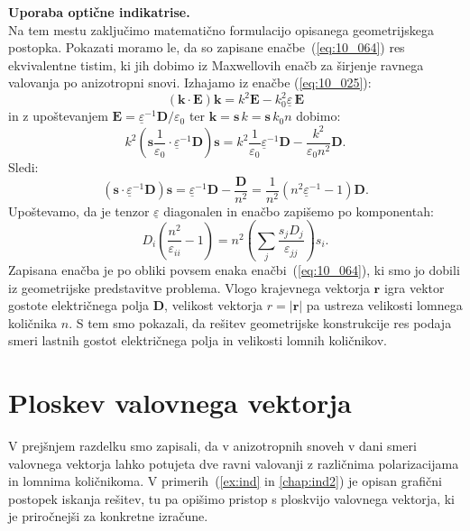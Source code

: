 \begin{example}{\bf Uporaba optične indikatrise.}
\begin{equation}
\label{eq:10_064}
\end{equation}
Na tem mestu zaključimo matematično formulacijo opisanega geometrijskega postopka. Pokazati moramo le, 
da so zapisane enačbe~(\ref{eq:10_064}) res ekvivalentne tistim, ki jih dobimo iz
Maxwellovih enačb za širjenje ravnega valovanja po anizotropni snovi. Izhajamo iz enačbe (\ref{eq:10_025}):
\begin{equation}
\left(\mathbf{k}\cdot \mathbf{E}\right)\mathbf{k} = k^2 \mathbf{E}- k_0^2\underline{\varepsilon}\,\mathbf{E}
\label{eq:10_065}
\end{equation}
in z upoštevanjem $\mathbf{E} = \underline{\varepsilon}^{-1} \mathbf{D}/\varepsilon_0$ 
ter $\mathbf{k} = \mathbf{s}\,k = \mathbf{s}\,k_0 n$ dobimo:
\begin{equation}
k^2 \left(\mathbf{s}\frac{1}{\varepsilon_0}\cdot \underline{\varepsilon}^{-1}\mathbf{D}\right) \mathbf{s} = k^2 \frac{1}{\varepsilon_0}\underline{\varepsilon}^{-1} \mathbf{D} - \frac{k^2}{\varepsilon_0 n^2}\mathbf{D}.
\label{eq:10_066}
\end{equation}
Sledi:
\begin{equation}
\left(\mathbf{s} \cdot \underline{\varepsilon}^{-1}\mathbf{D}\right) \mathbf{s} =
\underline{\varepsilon}^{-1} \mathbf{D} - \frac{\mathbf{D}}{n^2} = \frac{1}{n^2}\left( n^2 
\underline{\varepsilon}^{-1} -1 \right) \mathbf{D}.
\label{eq:10_067}
\end{equation}
Upoštevamo, da je tenzor $\underline{\varepsilon}$ diagonalen in enačbo 
zapišemo po komponentah:
\begin{equation}
D_i \left(\frac{n^2}{\varepsilon_{ii}}-1 \right) = n^2 \left(\sum_j\frac{s_j D_j}{\varepsilon_{jj}}\right) s_i.
\label{eq:10_068}
\end{equation}
Zapisana enačba je po obliki povsem enaka enačbi~(\ref{eq:10_064}), ki smo jo dobili iz 
geometrijske predstavitve problema. Vlogo krajevnega vektorja $\mathbf{r}$ igra vektor gostote
električnega polja $\mathbf{D}$, velikost vektorja $r = |\mathbf{r}|$ pa ustreza velikosti
lomnega količnika $n$. S tem smo pokazali, da rešitev geometrijske konstrukcije res podaja
smeri lastnih gostot električnega polja in velikosti lomnih količnikov.
\end{example}

\section{Ploskev valovnega vektorja}
V prejšnjem razdelku smo zapisali, da v anizotropnih snoveh v dani smeri valovnega vektorja
lahko potujeta dve ravni valovanji z različnima polarizacijama in lomnima količnikoma. V 
primerih~(\ref{ex:ind} in \ref{chap:ind2}) je opisan grafični postopek iskanja 
rešitev, tu pa opišimo pristop s ploskvijo valovnega vektorja, ki je priročnejši za konkretne izračune. 

